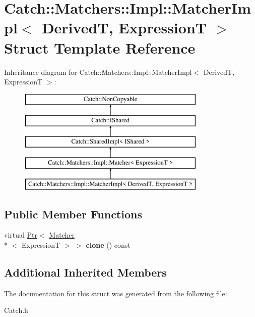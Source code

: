 \hypertarget{struct_catch_1_1_matchers_1_1_impl_1_1_matcher_impl}{\section{Catch\-:\-:Matchers\-:\-:Impl\-:\-:Matcher\-Impl$<$ Derived\-T, Expression\-T $>$ Struct Template Reference}
\label{struct_catch_1_1_matchers_1_1_impl_1_1_matcher_impl}
}
Inheritance diagram for Catch\-:\-:Matchers\-:\-:Impl\-:\-:Matcher\-Impl$<$ Derived\-T, Expression\-T $>$\-:\begin{figure}[H]
\begin{center}
\leavevmode
\includegraphics[height=5.000000cm]{struct_catch_1_1_matchers_1_1_impl_1_1_matcher_impl}
\end{center}
\end{figure}
\subsection*{Public Member Functions}
\begin{DoxyCompactItemize}
\item 
\hypertarget{struct_catch_1_1_matchers_1_1_impl_1_1_matcher_impl_afe2e10779f91394f80ff5c894fb1bfab}{virtual \hyperlink{class_catch_1_1_ptr}{Ptr}$<$ \hyperlink{struct_catch_1_1_matchers_1_1_impl_1_1_matcher}{Matcher}\\*
$<$ Expression\-T $>$ $>$ {\bfseries clone} () const }\label{struct_catch_1_1_matchers_1_1_impl_1_1_matcher_impl_afe2e10779f91394f80ff5c894fb1bfab}

\end{DoxyCompactItemize}
\subsection*{Additional Inherited Members}


The documentation for this struct was generated from the following file\-:\begin{DoxyCompactItemize}
\item 
Catch.\-h\end{DoxyCompactItemize}
